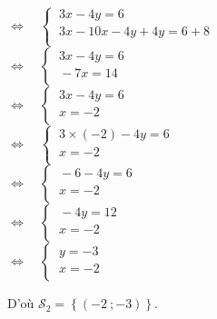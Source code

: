 \documentclass[a4paper,11pt,exos]{nsi}
\begin{document}
\begin{enumerate}
\begin{tabbing}
        \>  $\iff \quad \left\{
            \begin{array}{l}
            \ 3x-4y=6 \\
            \ 3x-10x-4y+4y=6+8 \\
        \end{array} \right.$\\[1em]

        \>  $\iff \quad \left\{
            \begin{array}{l}
            \ 3x-4y=6 \\
            \ -7x=14 \\
        \end{array} \right.$\\[1em]

        \>  $\iff \quad \left\{
            \begin{array}{l}
            \ 3x-4y=6 \\
            \ x=-2 \\
        \end{array} \right.$\\[1em]

        \>  $\iff \quad \left\{
            \begin{array}{l}
            \ 3\times (-2)-4y=6 \\
            \ x=-2 \\
        \end{array} \right.$\\[1em]

        \>  $\iff \quad \left\{
            \begin{array}{l}
            \ -6-4y=6 \\
            \ x=-2 \\
        \end{array} \right.$\\[1em]

        \>  $\iff \quad \left\{
            \begin{array}{l}
            \ -4y=12 \\
            \ x=-2 \\
        \end{array} \right.$\\[1em]

        \>  $\iff \quad \left\{
            \begin{array}{l}
            \ y=-3 \\
            \ x=-2 \\
        \end{array} \right.$\\[1em]
    \end{tabbing}
    D'où $\mathcal{S}_2=\left\{(-2\ ;-3)\right\}$.
\end{enumerate}
\end{document}

